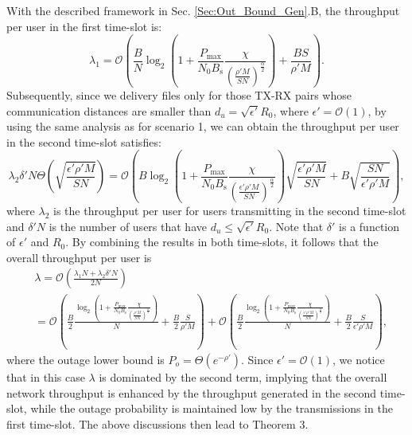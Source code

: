 \documentclass[journal,draftclsnofoot,onecolumn,12pt,twoside]{IEEEtran}
\begin{document}
With the described framework in Sec. \ref{Sec:Out_Bound_Gen}.B, the throughput per user in the first time-slot is: 
\begin{equation}
\lambda_1=\mathcal{O}\left(\frac{B}{N}\log_2\left(1+\frac{P_{\text{max}}}{N_0B_{\text{s}}}\frac{\chi}{\left(\frac{\rho'M}{SN}\right)^\frac{\alpha}{2}}\right)+\frac{BS}{\rho'M}\right).
\end{equation}
Subsequently, since we delivery files only for those TX-RX pairs whose communication distances are smaller than $d_u=\sqrt{\epsilon'} R_0$, where $\epsilon'=\mathcal{O}(1)$, by using the same analysis as for scenario 1, we can obtain the throughput per user in the second time-slot satisfies:
\begin{equation}\label{eq:out_lambda_2}
\lambda_2\delta' N\Theta\left(\sqrt{\frac{\epsilon'\rho'M}{SN}}\right)=\mathcal{O}\left(B\log_2\left(1+\frac{P_{\text{max}}}{N_0B_{\text{s}}}\frac{\chi}{\left(\frac{\epsilon'\rho'M}{SN}\right)^\frac{\alpha}{2}}\right)\sqrt{\frac{\epsilon'\rho'M}{SN}}+B\sqrt{\frac{SN}{\epsilon'\rho'M}}\right),
\end{equation}
where $\lambda_2$ is the throughput per user for users transmitting in the second time-slot and $\delta'N$ is the number of users that have $d_u\leq\sqrt{\epsilon'} R_0$. Note that $\delta'$ is a function of $\epsilon'$ and $R_0$. By combining the results in both time-slots, it follows that the overall throughput per user is
\begin{equation}
\begin{aligned}\label{eq:out_lambda_final}
&\lambda=\mathcal{O}\left(\frac{\lambda_1 N+ \lambda_2\delta' N }{2N}\right)\\
&=\mathcal{O}\left(\frac{B}{2}\frac{\log_2\left(1+\frac{P_{\text{max}}}{N_0B_{\text{s}}}\frac{\chi}{\left(\frac{\rho'M}{SN}\right)^\frac{\alpha}{2}}\right)}{N}+\frac{B}{2}\frac{S}{\rho'M}\right)+\mathcal{O}\left(\frac{B}{2}\frac{\log_2\left(1+\frac{P_{\text{max}}}{N_0B_{\text{s}}}\frac{\chi}{\left(\frac{\epsilon'\rho'M}{SN}\right)^\frac{\alpha}{2}}\right)}{N}+\frac{B}{2}\frac{S}{\epsilon'\rho'M}\right),
\end{aligned}
\end{equation}
where the outage lower bound is $P_o=\Theta\left(e^{-\rho'}\right)$. Since $\epsilon'=\mathcal{O}(1)$, we notice that in this case $\lambda$ is dominated by the second term, implying that the overall network throughput is enhanced by the throughput generated in the second time-slot, while the outage probability is maintained low by the transmissions in the first time-slot. The above discussions then lead to Theorem 3.
\end{document}
